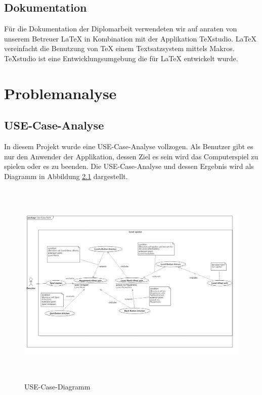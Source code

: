 \section{Dokumentation}
Für die Dokumentation der Diplomarbeit verwendeten wir auf anraten von unserem Betreuer LaTeX in Kombination mit der Applikation TeXstudio.
LaTeX vereinfacht die Benutzung von TeX einem Textsatzsystem mittels Makros. TeXstudio ist eine Entwicklungsumgebung die für LaTeX entwickelt wurde. \cite{Latex}
\chapter{Problemanalyse}
\section{USE-Case-Analyse}
In diesem Projekt wurde eine USE-Case-Analyse vollzogen. Als Benutzer gibt es nur den Anwender der Applikation, dessen Ziel es sein wird das Computerspiel zu spielen oder es zu beenden. Die USE-Case-Analyse und dessen Ergebnis wird als Diagramm in Abbildung \ref{USE-Case-Diagramm} dargestellt.
\begin{figure}[H]
	\centering
	\includegraphics[width=17.5cm,height=10cm]{images/UseCaseDiagram.jpg}
	\caption{USE-Case-Diagramm}
	\label{USE-Case-Diagramm}
\end{figure}


